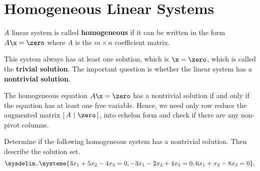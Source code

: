 
\section{Homogeneous Linear Systems}
\label{sec:homogeneous_linear_systems}

\begin{definition}
  \label{def:homogeneous_linear_systems}

  $A$ linear system is called \textbf{homogeneous} if it can be written in the
  form $A\x = \zero$ where $A$ is the $m \times n$ coefficient matrix.
\end{definition}

This system always has at least one solution, which is $\x = \zero$, which is
called the \textbf{trivial solution}. The important question is whether the
linear system has a \textbf{nontrivial solution}.

\begin{purpleframe}
  \label{prpl:homogeneous_linear_systems}

  The homogeneous equation $A\x = \zero$ has a nontrivial solution if and only
  if the equation has at least one free variable. Hence, we need only row reduce
  the augmented matrix $[\,A~\vert~\zero\,]$, into echelon form and check if
  there are any non-pivot columns.
\end{purpleframe}

\begin{question}
  \label{qst:homogeneous_linear_systems}

  Determine if the following homogeneous system has a nontrivial solution. Then
  describe the solution set.
  \[%
    \sysdelim..\systeme{
      3x_1 + 5x_2 - 4x_3 = 0,
      -3x_1 - 2x_2 + 4x_3 = 0,
      6x_1 + x_2 - 8x_3 = 0
    }
  .\]%
\end{question}

